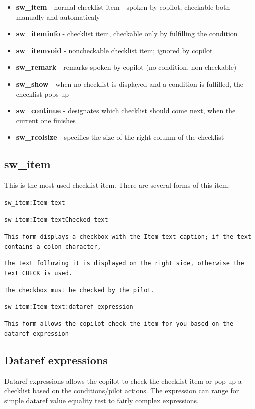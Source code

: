 \documentclass[11pt,parskip=half,a4paper]{scrartcl}
\newcommand\textstyleStrongEmphasis[1]{\textbf{#1}}
\newcommand\textstyleSourceText[1]{\texttt{#1}}
\begin{document}
\begin{itemize}
\item \textstyleStrongEmphasis{sw\_item} - normal checklist item - spoken by copilot, checkable both manually and automaticaly 
\item \textstyleStrongEmphasis{sw\_iteminfo} - checklist item, checkable only by fulfilling the condition 
\item \textstyleStrongEmphasis{sw\_itemvoid} - noncheckable checklist item; ignored by copilot 
\item \textstyleStrongEmphasis{sw\_remark} - remarks spoken by copilot (no condition, non-checkable) 
\item \textstyleStrongEmphasis{sw\_show} - when no checklist is displayed and a condition is fulfilled, the checklist pops up 
\item \textstyleStrongEmphasis{sw\_continue} - designates which checklist should come next, when the current one
finishes 
\item \textstyleStrongEmphasis{sw\_rcolsize} - specifies the size of the {\textquotedbl}right column{\textquotedbl} of the checklist 
\end{itemize}
\subsection{sw\_item}
This is the most used checklist item. There are several forms of this item:

\textstyleSourceText{sw\_item:Item text}

\textstyleSourceText{sw\_item:Item text{\textbar}Checked text}

{\ttfamily
\textstyleSourceText{This form displays a checkbox with the {\textquotedbl}Item text{\textquotedbl} caption; if the text contains a colon character,}}

{\ttfamily
\textstyleSourceText{the text following it is displayed on the right side, otherwise the text
{\textquotedbl}CHECK{\textquotedbl} is used.}}

{\ttfamily
\textstyleSourceText{The checkbox must be checked by the pilot.}}

\textstyleSourceText{sw\_item:Item text:dataref expression}

{\ttfamily
\textstyleSourceText{This form allows the {\textquotedbl}copilot{\textquotedbl} check the item for you based on the dataref expression}}

\subsection[Dataref expressions]{Dataref expressions}
Dataref expressions allows the {\textquotedbl}copilot{\textquotedbl} to check the checklist item or pop up a checklist based on the conditions/pilot actions. The expression can range for simple dataref value equality test to fairly complex expressions.
\end{document}
